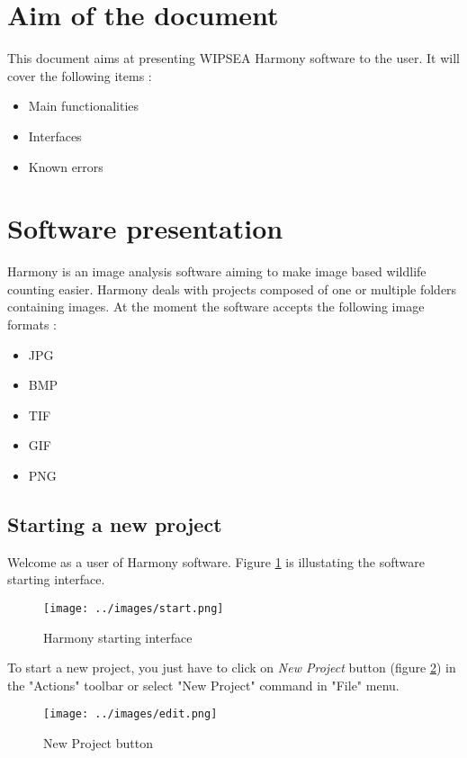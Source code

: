 \documentclass{article}
\begin{document}
\section{Aim of the document}
This document aims at presenting WIPSEA Harmony software to the user. It will cover the following items : 
\begin{itemize}
  \item Main functionalities
  \item Interfaces
  \item Known errors
\end{itemize}

\section{Software presentation}
Harmony is an image analysis software aiming to make image based wildlife counting easier. Harmony deals with projects composed of one or multiple folders containing images. At the moment the software accepts the following image formats : 
\begin{itemize}
  \item JPG
  \item BMP
  \item TIF
  \item GIF
  \item PNG
\end{itemize}

\newpage

\subsection{Starting a new project}
Welcome as a user of Harmony software. Figure \ref{fig:startUp} is illustating the software starting interface.
\begin{figure}[!h]
  \centering
  \texttt{[image: ../images/start.png]}
  \caption{\label{fig:startUp} Harmony starting interface }
\end{figure}

To start a new project, you just have to click on \emph{New Project} button (figure \ref{fig:NewProjectButton}) in the "Actions" toolbar or select "New Project" command in "File" menu.
\begin{figure}[!h]
  \centering
  \texttt{[image: ../images/edit.png]}
  \caption{\label{fig:NewProjectButton} New Project button }
\end{figure}
\end{document}
